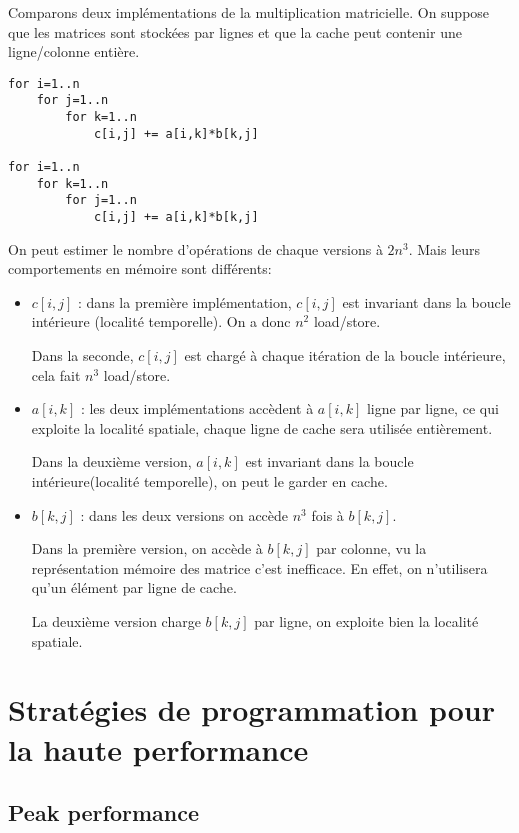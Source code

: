  Comparons deux implémentations de la multiplication matricielle. On suppose que les matrices sont stockées par lignes et que la cache peut contenir une ligne/colonne entière.
\begin{verbatim}
for i=1..n
    for j=1..n
        for k=1..n
            c[i,j] += a[i,k]*b[k,j]

for i=1..n
    for k=1..n
        for j=1..n
            c[i,j] += a[i,k]*b[k,j]
\end{verbatim}


On peut estimer le nombre d'opérations de chaque versions à $2n^3$. Mais leurs comportements en mémoire sont différents:

\begin{itemize}
	\item $c[i,j]$ : dans la première implémentation, $c[i,j]$ est invariant dans la boucle intérieure (localité temporelle). 
On a donc $n^2$ load/store.

Dans la seconde, $c[i,j]$ est chargé à chaque itération de la boucle intérieure, cela fait $n^3$ load/store.

	\item $a[i,k]$ : les deux implémentations accèdent à $a[i,k]$ ligne par ligne, ce qui exploite la localité spatiale, chaque ligne de cache sera utilisée entièrement. 
	
Dans la deuxième version, $a[i,k]$ est invariant dans la boucle intérieure(localité temporelle), on peut le garder en cache.
	\item $b[k,j]$ : dans les deux versions on accède $n^3$ fois à $b[k,j]$.
	
Dans la première version, on accède à $b[k,j]$ par colonne, vu la représentation mémoire des matrice c'est inefficace. En effet, on n'utilisera qu'un élément par ligne de cache.

La deuxième version charge $b[k,j]$ par ligne, on exploite bien la localité spatiale.
\end{itemize}

\section{Stratégies de programmation pour la haute performance}

	\subsection{Peak performance}
	
